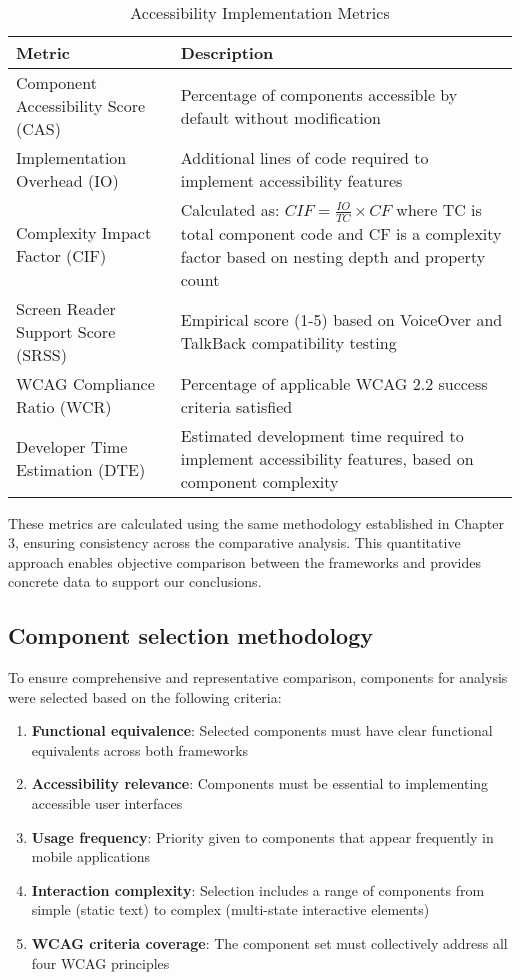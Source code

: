 \begin{table}[ht]
\caption{Accessibility Implementation Metrics}
\label{tab:accessibility_metrics}
\centering
\begin{tabular}{|p{4cm}|p{10cm}|}
\hline
\textbf{Metric} & \textbf{Description} \\
\hline
Component Accessibility Score (CAS) & Percentage of components accessible by default without modification \\
\hline
Implementation Overhead (IO) & Additional lines of code required to implement accessibility features \\
\hline
Complexity Impact Factor (CIF) & Calculated as: $CIF = \frac{IO}{TC} \times CF$ where TC is total component code and CF is a complexity factor based on nesting depth and property count \\
\hline
Screen Reader Support Score (SRSS) & Empirical score (1-5) based on VoiceOver and TalkBack compatibility testing \\
\hline
WCAG Compliance Ratio (WCR) & Percentage of applicable WCAG 2.2 success criteria satisfied \\
\hline
Developer Time Estimation (DTE) & Estimated development time required to implement accessibility features, based on component complexity \\
\hline
\end{tabular}
\end{table}

These metrics are calculated using the same methodology established in Chapter 3, ensuring consistency across the comparative analysis. This quantitative approach enables objective comparison between the frameworks and provides concrete data to support our conclusions.

\subsection{Component selection methodology}

To ensure comprehensive and representative comparison, components for analysis were selected based on the following criteria:

\begin{enumerate}
    \item \textbf{Functional equivalence}: Selected components must have clear functional equivalents across both frameworks
    
    \item \textbf{Accessibility relevance}: Components must be essential to implementing accessible user interfaces
    
    \item \textbf{Usage frequency}: Priority given to components that appear frequently in mobile applications
    
    \item \textbf{Interaction complexity}: Selection includes a range of components from simple (static text) to complex (multi-state interactive elements)
    
    \item \textbf{WCAG criteria coverage}: The component set must collectively address all four WCAG principles
\end{enumerate}

